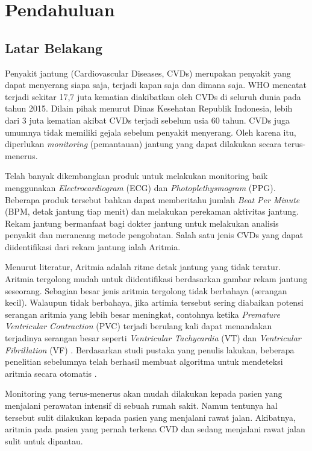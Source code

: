 \chapter{Pendahuluan}
\section{Latar Belakang}
Penyakit jantung (Cardiovascular Diseases, CVDs) merupakan penyakit yang dapat menyerang siapa saja, terjadi kapan saja dan dimana saja. WHO mencatat terjadi sekitar 17,7 juta kematian diakibatkan oleh CVDs di seluruh dunia pada tahun 2015\cite{who2015facts}. Dilain pihak menurut Dinas Kesehatan Republik Indonesia, lebih dari 3 juta kematian akibat CVDs terjadi sebelum usia 60 tahun\cite{depkes2014}. CVDs juga umumnya tidak memiliki gejala sebelum penyakit menyerang\cite{who2015facts}. Oleh karena itu, diperlukan \textit{monitoring} (pemantauan) jantung yang dapat dilakukan secara terus-menerus.

Telah banyak dikembangkan produk untuk melakukan monitoring baik menggunakan \textit{Electrocardiogram} (ECG) \cite{endo_holter} dan \textit{Photoplethysmogram} (PPG)\cite{online:fitbit, online:samsung_gear}. Beberapa produk tersebut bahkan dapat memberitahu jumlah \textit{Beat Per Minute} (BPM, detak jantung tiap menit) dan melakukan perekaman aktivitas jantung. Rekam jantung bermanfaat bagi dokter jantung untuk melakukan analisis penyakit dan merancang metode pengobatan. Salah satu jenis CVDs yang dapat diidentifikasi dari rekam jantung ialah Aritmia.

Menurut literatur, Aritmia adalah ritme detak jantung yang tidak teratur\cite{cvd_is}. Aritmia tergolong mudah untuk diidentifikasi berdasarkan gambar rekam jantung seseorang. Sebagian besar jenis aritmia tergolong tidak berbahaya (serangan kecil)\cite{arrhythmia_is}. Walaupun tidak berbahaya, jika artimia tersebut sering diabaikan potensi serangan aritmia yang lebih besar meningkat, contohnya ketika \textit{Premature Ventricular Contraction} (PVC) terjadi berulang kali dapat menandakan terjadinya serangan besar seperti \textit{Ventricular Tachycardia} (VT) dan \textit{Ventricular Fibrillation} (VF) \cite{rr_classification}. Berdasarkan studi pustaka yang penulis lakukan, beberapa penelitian sebelumnya telah berhasil membuat algoritma untuk mendeteksi aritmia secara otomatis \cite{rr_classification, aritmia_svm, aritmia_swarm, aritmia_ann}.

Monitoring yang terus-menerus akan mudah dilakukan kepada pasien yang menjalani perawatan intensif di sebuah rumah sakit. Namun tentunya hal tersebut sulit dilakukan kepada pasien yang menjalani rawat jalan. Akibatnya, aritmia pada pasien yang pernah terkena CVD dan sedang menjalani rawat jalan sulit untuk dipantau.

